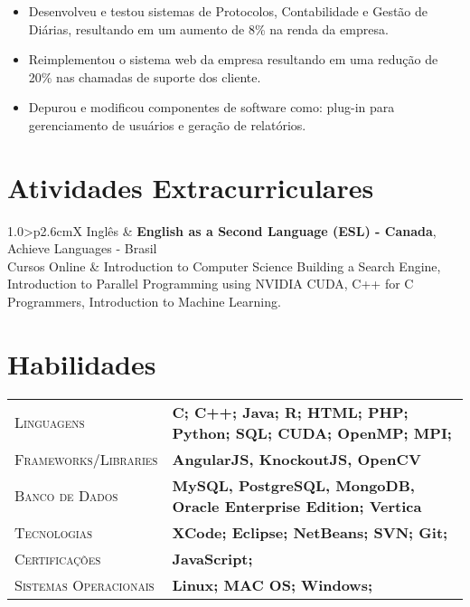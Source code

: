 \documentclass[9pt, a4paper, oneside, final]{scrartcl} %
\newcommand{\gray}{\rowcolor[gray]{.90}} %
\begin{document}
\begin{itemize}\itemsep1.5pt
\item Desenvolveu e testou sistemas de Protocolos, Contabilidade e Gestão de Diárias, resultando em um aumento de 8\% na renda da empresa.

\item Reimplementou o sistema web da empresa resultando em uma redução de 20\% nas chamadas de suporte dos cliente.


\item Depurou e modificou componentes de software como: plug-in para gerenciamento de usuários e geração de relatórios.
\end{itemize}

\section{Atividades Extracurriculares}

\begin{tabularx}{1.0\linewidth}{>{\raggedleft\scshape}p{2.6cm}X}
Inglês & \textbf{English as a Second Language (ESL) - Canada}, Achieve Languages - Brasil\\
Cursos Online & Introduction to Computer Science Building a Search Engine,  Introduction to Parallel Programming using NVIDIA CUDA, C++ for C Programmers, Introduction to Machine Learning.\\
\end{tabularx}


\section{Habilidades}

\begin{tabularx}{1.0\linewidth}{>{\raggedleft\scshape}p{3.6cm}X}
\gray Linguagens & \textbf{C; C++; Java; R; HTML; PHP; Python; SQL; CUDA; OpenMP; MPI;}\\
\gray Frameworks/Libraries & \textbf{AngularJS, KnockoutJS, OpenCV}\\
\gray Banco de Dados & \textbf{MySQL, PostgreSQL, MongoDB, Oracle Enterprise Edition; Vertica}\\
\gray Tecnologias & \textbf{XCode; Eclipse; NetBeans; SVN; Git;}\\
\gray Certificações & \textbf{JavaScript;}\\
\gray Sistemas Operacionais & \textbf{Linux; MAC OS; Windows;}\\
\end{tabularx}
\end{document}
